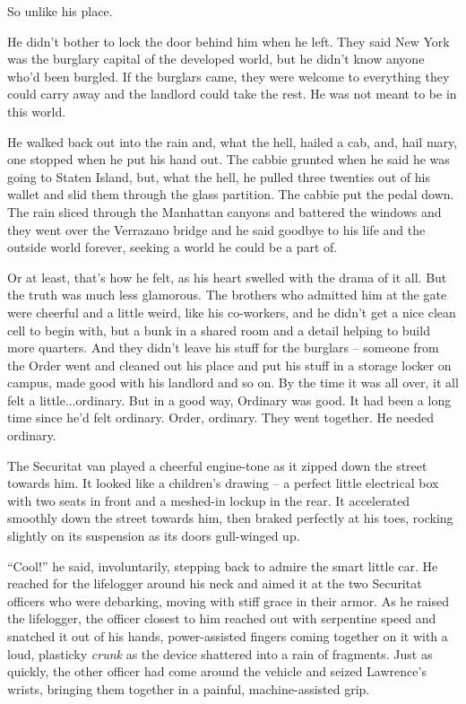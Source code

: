So unlike his place.

He didn't bother to lock the door behind him when he left. They said 
New York was the burglary capital of the developed world, but he didn't 
know anyone who'd been burgled. If the burglars came, they were welcome 
to everything they could carry away and the landlord could take the 
rest. He was not meant to be in this world.

He walked back out into the rain and, what the hell, hailed a cab, and, 
hail mary, one stopped when he put his hand out. The cabbie grunted 
when he said he was going to Staten Island, but, what the hell, he 
pulled three twenties out of his wallet and slid them through the glass 
partition. The cabbie put the pedal down. The rain sliced through the 
Manhattan canyons and battered the windows and they went over the 
Verrazano bridge and he said goodbye to his life and the outside world 
forever, seeking a world he could be a part of.

Or at least, that's how he felt, as his heart swelled with the drama of 
it all. But the truth was much less glamorous. The brothers who 
admitted him at the gate were cheerful and a little weird, like his 
co-workers, and he didn't get a nice clean cell to begin with, but a 
bunk in a shared room and a detail helping to build more quarters. And 
they didn't leave his stuff for the burglars -- someone from the Order 
went and cleaned out his place and put his stuff in a storage locker on 
campus, made good with his landlord and so on. By the time it was all 
over, it all felt a little...ordinary. But in a good way, Ordinary was 
good. It had been a long time since he'd felt ordinary. Order, 
ordinary. They went together. He needed ordinary.

\tb

The Securitat van played a cheerful engine-tone as it zipped down the 
street towards him. It looked like a children's drawing -- a perfect 
little electrical box with two seats in front and a meshed-in lockup in 
the rear. It accelerated smoothly down the street towards him, then 
braked perfectly at his toes, rocking slightly on its suspension as its 
doors gull-winged up.

“Cool!” he said, involuntarily, stepping back to admire the smart 
little car. He reached for the lifelogger around his neck and aimed it 
at the two Securitat officers who were debarking, moving with stiff 
grace in their armor. As he raised the lifelogger, the officer closest 
to him reached out with serpentine speed and snatched it out of his 
hands, power-assisted fingers coming together on it with a loud, 
plasticky \emph{crunk} as the device shattered into a rain of 
fragments. Just as quickly, the other officer had come around the 
vehicle and seized Lawrence's wrists, bringing them together in a 
painful, machine-assisted grip.

